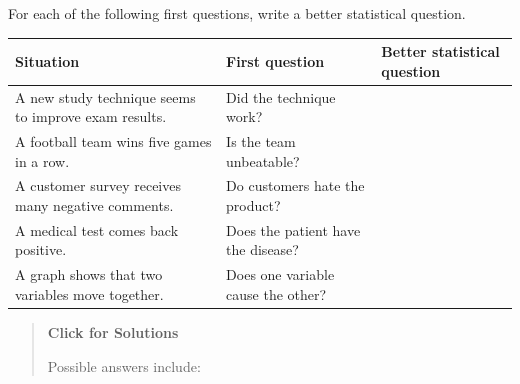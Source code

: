 \documentclass[
  letterpaper,
  DIV=11,
  numbers=noendperiod]{scrreprt}
\begin{document}
\begin{tcolorbox}[enhanced jigsaw, arc=.35mm, bottomrule=.15mm, bottomtitle=1mm, breakable, colback=white, colbacktitle=quarto-callout-note-color!10!white, colframe=quarto-callout-note-color-frame, coltitle=black, left=2mm, leftrule=.75mm, opacityback=0, opacitybacktitle=0.6, rightrule=.15mm, title=\textcolor{quarto-callout-note-color}{\faInfo}\hspace{0.5em}{Question 2}, titlerule=0mm, toprule=.15mm, toptitle=1mm]

For each of the following first questions, write a better statistical
question.

\begin{table}
\fontsize{12.0pt}{14.0pt}\selectfont
\begin{tabular*}{\linewidth}{@{\extracolsep{\fill}}lll}
\toprule
Situation & First question & Better statistical question \\ 
\midrule\addlinespace[2.5pt]
A new study technique seems to improve exam results. & Did the technique work? &  \\ 
A football team wins five games in a row. & Is the team unbeatable? &  \\ 
A customer survey receives many negative comments. & Do customers hate the product? &  \\ 
A medical test comes back positive. & Does the patient have the disease? &  \\ 
A graph shows that two variables move together. & Does one variable cause the other? &  \\ 
\bottomrule
\end{tabular*}
\end{table}

\begin{quote}
\textbf{Click for Solutions}

Possible answers include:


\end{quote}
\end{tcolorbox}
\end{document}
